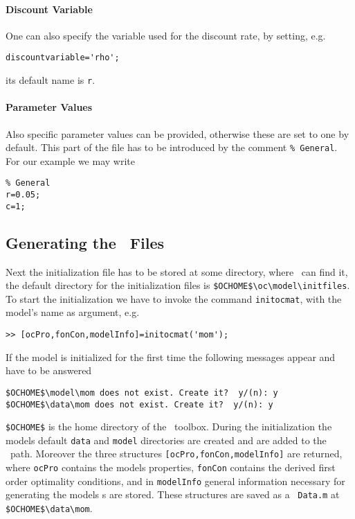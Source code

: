 \paragraph{Discount Variable}
One can also specify the variable used for the discount rate, by setting, e.g.
\begin{lstlisting}
discountvariable='rho';
\end{lstlisting}
its default name is \lstinline+r+.

\paragraph{Parameter Values}

Also specific parameter values can be provided, otherwise these are set to one by default. This part of the file has to be introduced by the comment \lstinline+% General+. For our example we may write
\begin{lstlisting}
% General
r=0.05;
c=1;
\end{lstlisting}

\subsection{Generating the \MATL\ Files}
Next the initialization file has to be stored at some directory, where \MATL\ can find it, the default directory for the initialization files is \lstinline+$OCHOME$\oc\model\initfiles+. To start the initialization we have to invoke the command \lstinline+initocmat+, with the model's name as argument, e.g.
\begin{lstlisting}
>> [ocPro,fonCon,modelInfo]=initocmat('mom');
\end{lstlisting}
If the model is initialized for the first time the following messages appear and have to be answered
\begin{lstlisting}
$OCHOME$\model\mom does not exist. Create it?  y/(n): y
$OCHOME$\data\mom does not exist. Create it?  y/(n): y
\end{lstlisting}
\lstinline+$OCHOME$+ is the home directory of the \OCT\ toolbox. During the initialization the models default \lstinline+data+ and \lstinline+model+ directories are created and are added to the \MATL\ path. Moreover the three structures \lstinline+[ocPro,fonCon,modelInfo]+ are returned, where \lstinline+ocPro+ contains the models properties, \lstinline+fonCon+ contains the derived first order optimality conditions, and in \lstinline+modelInfo+ general information necessary for generating the models \mfile s are stored. These structures are saved as a \matfile\ \lstinline+Data.m+ at \lstinline+$OCHOME$\data\mom+.

